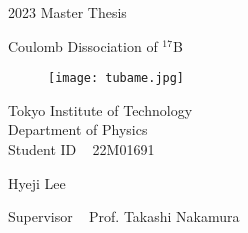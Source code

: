 \documentclass[11pt]{book}
\begin{document}
\frontmatter

\begin{titlepage}
    \begin{center}

    \null
    \vspace{1cm}
    {\Large 2023 Master Thesis}\\
    \vspace{0.5cm}

    \vspace{2cm}
    {\Huge Coulomb Dissociation of ${}^{17}$B}\\

    \vspace{2cm}
    \begin{figure}[h]
        \centering
        \texttt{[image: tubame.jpg]}        
    \end{figure}


    \vspace{2.3cm}
    Tokyo Institute of Technology \\
    Department of Physics \\

    \vspace{0.2cm}
    Student ID ~ 22M01691

    \vspace{0.5cm}
    {\Large Hyeji Lee}
    \vspace{1cm}

    \vfill
    {\large Supervisor ~ Prof. Takashi Nakamura}

    \end{center}
\end{titlepage}

\cleardoublepage %

\end{document}
